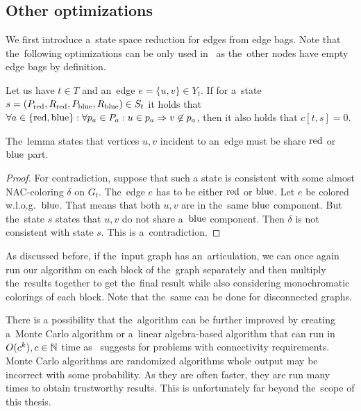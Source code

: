 \subsection{Other optimizations}

We first introduce a~state space reduction for edges from edge bags.
%
Note that the~following optimizations can be only used in~\IntroduceEdgeNode{}
as the~other nodes have empty edge bags by definition.
%
\begin{lemma}
	Let us have \( t \in T \) and an~edge \( e = \{u, v\} \in Y_t \).
	If for a~state \( s = (P_{\text{red}}, R_{\text{red}}, P_{\text{blue}}, R_{\text{blue}}) \in S_t \)
	it holds that
	\( {\forall a \in \{\text{red}, \text{blue}\}} : {\forall p_a \in P_a} : {u \in p_a \Rightarrow v \not\in p_a} \),
	then it also holds that \( c[t, s] = 0 \).
\end{lemma}
%
The~lemma states that vertices \( u, v \) incident to an~edge must
be share \( \text{red} \) or \( \text{blue} \) part.
%
\begin{proof}
	For contradiction, suppose that such a state is consistent
	with some almost NAC-coloring \( \delta \) on \( G_t \).
	The~edge \( e \) has to be either \( \text{red} \) or \( \text{blue} \).
	Let \( e \) be colored w.l.o.g.\ \( \text{blue} \).
	That means that both \( u, v \) are in the~same \( \text{blue} \) component.
	But the~state \( s \) states that \( u, v \) do not share a~\( \text{blue} \) component.
	Then \( \delta \) is not consistent with state \( s \).
	This is a~contradiction.
\end{proof}

As discussed before, if the~input graph has an~articulation,
we can once again run our algorithm on each block of the~graph separately
and then multiply the~results together to get the~final result
while also considering monochromatic colorings of each block.
Note that the~same can be done for disconnected graphs.

There is a possibility that the~algorithm can be further improved by creating
a~Monte Carlo algorithm or a~linear algebra-based algorithm that can run
in~\( O(c^k), c \in \mathbb{N} \) time as~\cite{book_parametrized_algorithms} suggests
for problems with connectivity requirements.
Monte Carlo algorithms are randomized algorithms whole output may be incorrect
with some probability. As they are often faster, they are run many times
to obtain trustworthy results.
This is unfortunately far beyond the~scope of this thesis.

